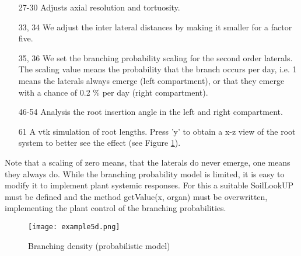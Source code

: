 \begin{itemize}

\item[27-30] Adjusts axial resolution and tortuosity.

\item[33, 34] We adjust the inter lateral distances by making it smaller for a factor five.

\item[35, 36] We set the branching probability scaling for the second order laterals. The scaling value means the probability that the branch occurs per day, i.e. 1 means the laterals always emerge (left compartment), or that they emerge with a chance of 0.2 \% per day (right compartment). 

\item[46-54] Analysis the root insertion angle in the left and right compartment. 

\item[61] A vtk simulation of root lengths. Press 'y' to obtain a x-z view of the root system to better see the effect (see Figure \ref{fig:probability}). 

\end{itemize}

Note that a scaling of zero means, that the laterals do never emerge, one means they always do. While the branching probability model is limited, it is easy to modify it to implement plant systemic responses. For this a suitable SoilLookUP must be defined and the method getValue(x, organ) must be overwritten, implementing the plant control of the branching probabilities. 

\begin{figure}
\centering
\texttt{[image: example5d.png]}
\caption{Branching density (probabilistic model)} \label{fig:probability}
\end{figure}
